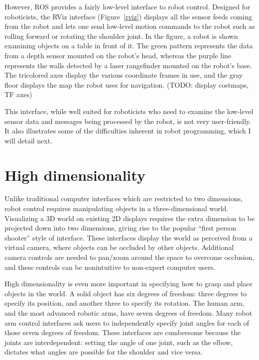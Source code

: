 \documentclass{article}
\begin{document}
However, ROS provides a fairly low-level interface to robot control. Designed for roboticists, the RViz interface (Figure~\ref{rviz}) displays all the sensor feeds coming from the robot and lets one send low-level motion commands to the robot such as rolling forward or rotating the shoulder joint. In the figure, a robot is shown examining objects on a table in front of it. The green pattern represents the data from a depth sensor mounted on the robot's head, whereas the purple line represents the walls detected by a laser rangefinder mounted on the robot's base. The tricolored axes display the various coordinate frames in use, and the gray floor displays the map the robot uses for navigation. (TODO: display costmaps, TF axes)

This interface, while well suited for roboticists who need to examine the low-level sensor data and messages being processed by the robot, is not very user-friendly. It also illustrates some of the difficulties inherent in robot programming, which I will detail next.

\section{High dimensionality}


Unlike traditional computer interfaces which are restricted to two dimensions, robot control requires manipulating objects in a three-dimensional world. Visualizing a 3D world on existing 2D displays requires the extra dimension to be projected down into two dimensions, giving rise to the popular ``first person shooter'' style of interface. These interfaces display the world as perceived from a virtual camera, where objects can be occluded by other objects. Additional camera controls are needed to pan/zoom around the space to overcome occlusion, and these controls can be nonintuitive to non-expert computer users.

High dimensionality is even more important in specifying how to grasp and place objects in the world. A solid object has six degrees of freedom: three degrees to specify its position, and another three to specify its rotation. The human arm, and the most advanced robotic arms, have seven degrees of freedom.  Many robot arm control interfaces ask users to independently specify joint angles for each of those seven degrees of freedom. These interfaces are cumbersome because the joints are interdependent: setting the angle of one joint, such as the elbow, dictates what angles are possible for the shoulder and vice versa.
\end{document}
